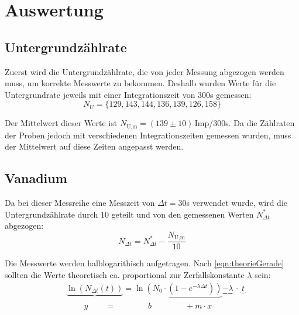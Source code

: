 \section{Auswertung}
    \subsection{Untergrundzählrate}
        Zuerst wird die Untergrundzählrate, die von jeder Messung abgezogen werden muss, um korrekte Messwerte zu bekommen.
        Deshalb wurden Werte für die Untergrundrate jeweils mit einer Integrationszeit von 300s gemessen:
        \begin{equation*}
            N_U = \{129, 143, 144, 136, 139, 126, 158\}
        \end{equation*}

        Der Mittelwert dieser Werte ist $N_{\text{U,m}} = (139 \pm 10)\,$Imp/300s. Da die Zählraten der Proben jedoch mit verschiedenen Integrationszeiten gemessen wurden, muss der Mittelwert auf diese Zeiten angepasst werden.

    \subsection{Vanadium}
        Da bei dieser Messreihe eine Messzeit von $\Delta t = 30$s verwendet wurde, wird die Untergrundzählrate durch 10 geteilt und von den gemessenen Werten $N^*_{\Delta t}$ abgezogen:
        \begin{equation*}
            N_{\Delta t} = N^*_{\Delta t} - \frac{N_{\text{U,m}}}{10}
        \end{equation*}
        
        Die Messwerte werden halblogarithisch aufgetragen. Nach \autoref{eqn:theorieGerade} sollten die Werte theoretisch ca. proportional zur Zerfallskonstante $\lambda$ sein:
        \begin{align*}
            &\underbrace{\ln\left(N_{\Delta t}(t)\right)} = \underbrace{\ln \left(N_0 \cdot \left(1 - e^{-\lambda \Delta t}\right)\right)} \underbrace{ - \lambda} \hspace{2pt} \cdot \hspace{3pt} \underbrace{t} \\
            & \hspace{26pt} y \hspace{25pt} = \hspace{47pt} b \hspace{49pt} + m \cdot x
        \end{align*}            

